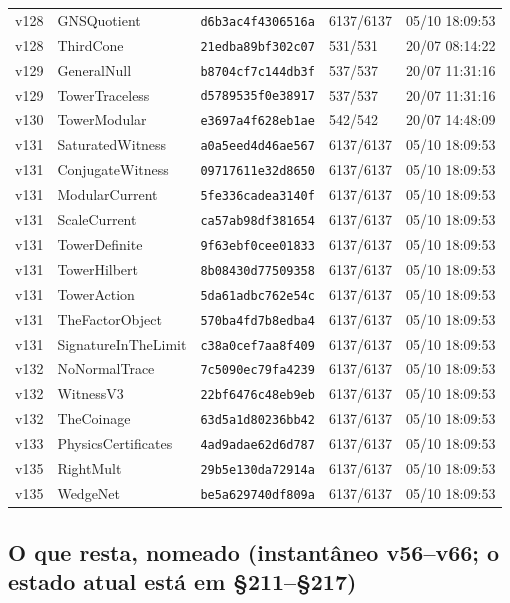 \documentclass[11pt]{article}
\theoremstyle{definition}\newtheorem{deriv}{Derivação}
\begin{document}
{\begin{longtable}{@{}lllll@{}}
v128 & GNSQuotient & \texttt{d6b3ac4f4306516a} & 6137/6137 & 05/10 18:09:53 \\
v128 & ThirdCone & \texttt{21edba89bf302c07} & 531/531 & 20/07 08:14:22 \\
v129 & GeneralNull & \texttt{b8704cf7c144db3f} & 537/537 & 20/07 11:31:16 \\
v129 & TowerTraceless & \texttt{d5789535f0e38917} & 537/537 & 20/07 11:31:16 \\
v130 & TowerModular & \texttt{e3697a4f628eb1ae} & 542/542 & 20/07 14:48:09 \\
v131 & SaturatedWitness & \texttt{a0a5eed4d46ae567} & 6137/6137 & 05/10 18:09:53 \\
v131 & ConjugateWitness & \texttt{09717611e32d8650} & 6137/6137 & 05/10 18:09:53 \\
v131 & ModularCurrent & \texttt{5fe336cadea3140f} & 6137/6137 & 05/10 18:09:53 \\
v131 & ScaleCurrent & \texttt{ca57ab98df381654} & 6137/6137 & 05/10 18:09:53 \\
v131 & TowerDefinite & \texttt{9f63ebf0cee01833} & 6137/6137 & 05/10 18:09:53 \\
v131 & TowerHilbert & \texttt{8b08430d77509358} & 6137/6137 & 05/10 18:09:53 \\
v131 & TowerAction & \texttt{5da61adbc762e54c} & 6137/6137 & 05/10 18:09:53 \\
v131 & TheFactorObject & \texttt{570ba4fd7b8edba4} & 6137/6137 & 05/10 18:09:53 \\
v131 & SignatureInTheLimit & \texttt{c38a0cef7aa8f409} & 6137/6137 & 05/10 18:09:53 \\
v132 & NoNormalTrace & \texttt{7c5090ec79fa4239} & 6137/6137 & 05/10 18:09:53 \\
v132 & WitnessV3 & \texttt{22bf6476c48eb9eb} & 6137/6137 & 05/10 18:09:53 \\
v132 & TheCoinage & \texttt{63d5a1d80236bb42} & 6137/6137 & 05/10 18:09:53 \\
v133 & PhysicsCertificates & \texttt{4ad9adae62d6d787} & 6137/6137 & 05/10 18:09:53 \\
v135 & RightMult & \texttt{29b5e130da72914a} & 6137/6137 & 05/10 18:09:53 \\
v135 & WedgeNet & \texttt{be5a629740df809a} & 6137/6137 & 05/10 18:09:53 \\
\bottomrule\end{longtable}}

\subsection*{O que resta, nomeado (instantâneo v56--v66; o estado atual está em \S211--\S217)}
\end{document}
